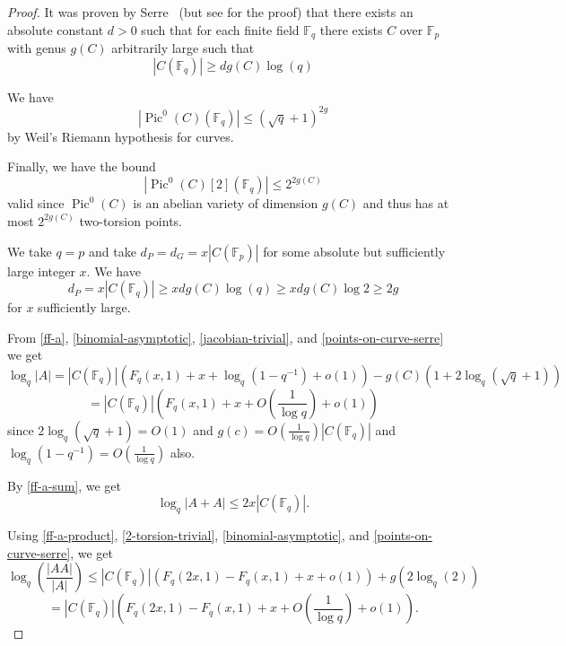 \documentclass{amsart}
\numberwithin{equation}{section}
\newcommand{\abs}[1]{\mathopen{}\left| #1\mathclose{}\right|}
\begin{document}
\begin{proof} It was proven by Serre~\cite{Serre83} (but see \cite[Appendix]{Elkies2004} for the proof) that there exists an absolute constant $d>0$ such that for each finite field $\mathbb F_q$ there exists $C$ over $\mathbb F_p$ with genus $g(C)$ arbitrarily large such that \begin{equation}\label{points-on-curve-serre} \abs{C(\mathbb F_q)}  \geq d g(C) \log(q) \end{equation}

We have
\begin{equation}\label{jacobian-trivial} \abs{\operatorname{Pic}^0(C)(\mathbb F_q)} \leq (\sqrt{q}+1)^{2g} \end{equation}
by Weil's Riemann hypothesis for curves.

 Finally, we have the bound
 \begin{equation}\label{2-torsion-trivial} \abs{\operatorname{Pic}^0(C)[2](\mathbb F_q)}\leq 2^{2 g(C)}\end{equation} valid since $\operatorname{Pic}^0(C)$ is an abelian variety of dimension $g(C)$ and thus has at most $2^{2g(C)}$ two-torsion points. 

We take $q=p$ and take $d_P = d_G = x  \abs{ C(\mathbb F_p)}$ for some absolute but sufficiently large integer $x$.  We have 
\[d_P = x \abs{C(\mathbb F_q)} \geq xd g(C) \log (q) \geq xd g(C) \log 2 \geq 2g \]
for $x$ sufficiently large. 

From \eqref{ff-a}, \eqref{binomial-asymptotic}, \eqref{jacobian-trivial}, and \eqref{points-on-curve-serre} we get
\[ \log_q \abs{A}= \abs{C(\mathbb F_q)} (F_q(x,1) + x + \log_q(1-q^{-1}) +o(1))  - g(C) ( 1+ 2\log_q (\sqrt{q}+1)) \]
\[ =\abs{C(\mathbb F_q)} \left(F_q(x,1) + x + O\left( \frac{1}{\log q} \right) + o(1) \right) \]
since $2\log_q (\sqrt{q}+1)=O(1)$ and $g(c) = O ( \frac{1}{\log q} ) \abs{C(\mathbb F_q)} $  and $\log_q(1-q^{-1})= O ( \frac{1}{\log q} ) $ also.

By  \eqref{ff-a-sum}, we get
\[ \log_q \abs{A+A} \leq  2x \abs{C(\mathbb F_q)} .\]

Using \eqref{ff-a-product}, \eqref{2-torsion-trivial}, \eqref{binomial-asymptotic}, and \eqref{points-on-curve-serre}, we get
\[ \log_q \left(\frac{\abs{AA}}{\abs{A}}\right) \leq  \abs{C(\mathbb F_q)} ( F_q(2x,1) - F_q(x,1) +x+ o(1) )  + g ( 2 \log_q(2) )\]
\[ = \abs{C(\mathbb F_q)} ( F_q(2x,1) - F_q(x,1) +x+O\left(\frac{1}{\log q}\right) +o(1) ).\]


\end{proof}
\end{document}
